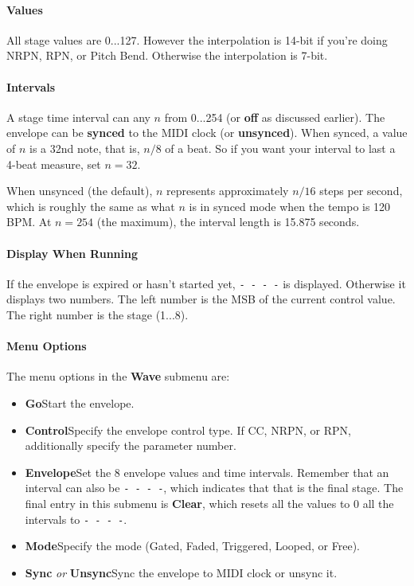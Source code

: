 \documentclass{article}
\begin{document}
\paragraph{Values}  All stage values are 0...127.  However the interpolation is 14-bit if you're doing NRPN, RPN, %
or Pitch Bend.  Otherwise the interpolation is 7-bit.

\paragraph{Intervals} A stage time interval can any \(n\) from 0...254 (or {\bf off} as discussed earlier).  The envelope can be {\bf synced} to the MIDI clock (or {\bf unsynced}). When synced, a value of \(n\) is a 32nd note, that is, \(n/8\) of a beat.  So if you want your interval to last a 4-beat measure, set \(n=32\).

When unsynced (the default), \(n\) represents approximately \(n/16\) steps per second, which is roughly the same as what \(n\) is in synced mode when the tempo is 120 BPM.    At \(n=254\) (the maximum), the interval length is 15.875 seconds.

\paragraph{Display When Running}  If the envelope is expired or hasn't started yet,  \texttt{-~-~-~-} is displayed.  Otherwise it displays two numbers.  The left number is the MSB of the current control value.  The right number is the stage (1...8).

\paragraph{Menu Options}  The menu options in the {\bf Wave} submenu are:

\begin{itemize}
\item {\bf Go}\quad Start the envelope.
\item {\bf Control}\quad Specify the envelope control type.  If CC, NRPN, or RPN, additionally specify the parameter number. 
\item {\bf Envelope}\quad Set the 8 envelope values and time intervals.  Remember that an interval can also be \texttt{-~-~-~-}, which indicates that that is the final stage.  The final entry in this submenu is {\bf Clear}, which resets all the values to 0 all the intervals to \texttt{-~-~-~-}. 
\item {\bf Mode}\quad Specify the mode (Gated, Faded, Triggered, Looped, or Free).
\item {\bf Sync} {\it or} {\bf Unsync}\quad Sync the envelope to MIDI clock or unsync it.
\end{itemize}
\end{document}
